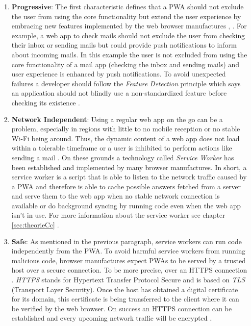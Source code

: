 \begin{enumerate} 
	\item  \textbf{Progressive}: The first characteristic defines that a PWA should not exclude the user from using the core functionality but extend the user experience by embracing new features implemented by the web browser manufactures \cite[p. 100]{liebelProgressiveWebApps2019}, \cite[p. 2]{hajianProgressiveWebApps2019}. For example, a web app to check mails should not exclude the user from checking their inbox or sending mails but could provide push notifications to inform about incoming mails. In this example the user is not excluded from using the core functionality of a mail app (checking the inbox and sending mails) and user experience is enhanced by push notifications. To avoid unexpected failures a developer should follow the \textit{Feature Detection} principle which says an application should not blindly use a non-standardized feature before checking its existence \cite[p. 101]{liebelProgressiveWebApps2019}.

	\item \textbf{Network Independent}: Using a regular web app on the go can be a problem, especially in regions with little to no mobile reception or no stable Wi-Fi being around. Thus, the dynamic content of a web app does not load within a tolerable timeframe or a user is inhibited to perform actions like sending a mail \cite[p. 106]{liebelProgressiveWebApps2019}. On these grounds a technology called \textit{Service Worker} has been established and implemented by many browser manufactures. In short, a service worker is a script that is able to listen to the network traffic caused by a PWA and therefore is able to cache possible answers fetched from a server and serve them to the web app when no stable network connection is available or do background syncing by running code even when the web app isn’t in use. For more information about the service worker see chapter \ref{sec:theorieCc} \cite[p. 43]{sheppardBeginningProgressiveWeb2017}.

	\item \textbf{Safe}: As mentioned in the previous paragraph, service workers can run code independently from the PWA. To avoid harmful service workers from running malicious code, browser manufactures expect PWAs to be served by a trusted host over a secure connection. To be more precise, over an HTTPS connection \cite[p. 24]{sheppardBeginningProgressiveWeb2017}. \textit{HTTPS} stands for Hypertext Transfer Protocol Secure and is based on \textit{TLS} (Transport Layer Security). Once the host has obtained a digital certificate for its domain, this certificate is being transferred to the client where it can be verified by the web browser. On success an HTTPS connection can be established and every upcoming network traffic will be encrypted \cite[pp. 112-113]{liebelProgressiveWebApps2019}.


\end{enumerate}
